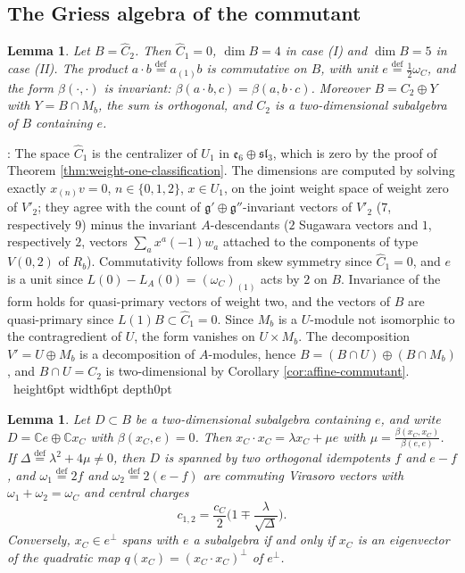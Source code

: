 \documentclass[leqno]{article}
\newcommand{\Cbb}{\ensuremath{\mathbb{C}}}
\newcommand{\qed}{\hfill \vrule height6pt  width6pt depth0pt}
\newcommand{\ov}{\overset}
\newtheorem{lemma}[thm]{Lemma}
\newenvironment{proof}[1][]{\noindent {\it Proof #1} : }{\hbox{~}\qed
\smallskip
}
\numberwithin{equation}{section}
\begin{document}
\subsection{The Griess algebra of the commutant}

\begin{lemma}
\label{lem:griess-B}
Let $B = \widehat C_2$. Then $\widehat C_1 = 0$, $\dim B = 4$ in case (I) and $\dim B = 5$ in case (II). The product $a \cdot b \ov{\mathrm{def}}{=} a_{(1)}b$ is commutative on $B$, with unit $e \ov{\mathrm{def}}{=} \frac{1}{2}\omega_C$, and the form $\beta(\cdot,\cdot)$ is invariant: $\beta(a \cdot b,c) = \beta(a,b \cdot c)$. Moreover $B = C_2 \oplus Y$ with $Y = B \cap M_b$, the sum is orthogonal, and $C_2$ is a two-dimensional subalgebra of $B$ containing $e$.
\end{lemma}

\begin{proof}
The space $\widehat C_1$ is the centralizer of $U_1$ in $\mathfrak e_6 \oplus \mathfrak{sl}_3$, which is zero by the proof of Theorem \ref{thm:weight-one-classification}. The dimensions are computed by solving exactly $x_{(n)}v = 0$, $n \in \{0,1,2\}$, $x \in U_1$, on the joint weight space of weight zero of $V'_2$; they agree with the count of $\mathfrak g' \oplus \mathfrak g''$-invariant vectors of $V'_2$ ($7$, respectively $9$) minus the invariant $A$-descendants ($2$ Sugawara vectors and $1$, respectively $2$, vectors $\sum_a x^a(-1)w_a$ attached to the components of type $V(0,2)$ of $R_b$). Commutativity follows from skew symmetry since $\widehat C_1 = 0$, and $e$ is a unit since $L(0)-L_A(0) = (\omega_C)_{(1)}$ acts by $2$ on $B$. Invariance of the form holds for quasi-primary vectors of weight two, and the vectors of $B$ are quasi-primary since $L(1)B \subset \widehat C_1 = 0$. Since $M_b$ is a $U$-module not isomorphic to the contragredient of $U$, the form vanishes on $U \times M_b$. The decomposition $V' = U \oplus M_b$ is a decomposition of $A$-modules, hence $B = (B \cap U) \oplus (B \cap M_b)$, and $B \cap U = C_2$ is two-dimensional by Corollary \ref{cor:affine-commutant}.
\end{proof}

\begin{lemma}
\label{lem:two-dim-subalgebras}
Let $D \subset B$ be a two-dimensional subalgebra containing $e$, and write $D = \Cbb e \oplus \Cbb x_C$ with $\beta(x_C,e) = 0$. Then $x_C \cdot x_C = \lambda x_C+\mu e$ with $\mu = \frac{\beta(x_C,x_C)}{\beta(e,e)}$. If $\Delta \ov{\mathrm{def}}{=} \lambda^2+4\mu \neq 0$, then $D$ is spanned by two orthogonal idempotents $f$ and $e-f$, and $\omega_1 \ov{\mathrm{def}}{=} 2f$ and $\omega_2 \ov{\mathrm{def}}{=} 2(e-f)$ are commuting Virasoro vectors with $\omega_1+\omega_2 = \omega_C$ and central charges
\begin{equation}
\label{eq:charges-split}
c_{1,2} = \frac{c_C}{2}\Big(1 \mp \frac{\lambda}{\sqrt{\Delta}}\Big).
\end{equation}
Conversely, $x_C \in e^\perp$ spans with $e$ a subalgebra if and only if $x_C$ is an eigenvector of the quadratic map $q(x_C) = (x_C \cdot x_C)^\perp$ of $e^\perp$.
\end{lemma}
\end{document}
